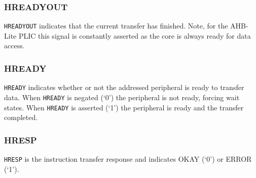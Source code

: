 \subsubsection{HREADYOUT}

\texttt{HREADYOUT} indicates that the current transfer has finished.
Note, for the AHB-Lite PLIC this signal is constantly asserted as the
core is always ready for data access.

\subsubsection{HREADY}

\texttt{HREADY} indicates whether or not the addressed peripheral is
ready to transfer data. When \texttt{HREADY} is negated (`0') the
peripheral is not ready, forcing wait states. When \texttt{HREADY} is
asserted (`1') the peripheral is ready and the transfer completed.

\subsubsection{HRESP}

\texttt{HRESP} is the instruction transfer response and indicates OKAY
(`0') or ERROR (`1').

\newpage
